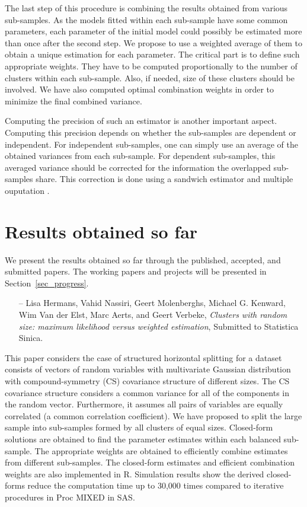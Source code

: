 \documentclass[14pt]{article}
\begin{document}
The last step of this procedure is combining the results obtained from various sub-samples. As the models fitted within each sub-sample have some common parameters, each parameter of the initial model could possibly be estimated more than once after the second step. We propose to use a weighted average of them to obtain a unique estimation for each parameter. The critical part is to define such appropriate weights. They have to be computed proportionally to the number of clusters within each sub-sample. Also, if needed, size of these clusters should be involved. We have also computed optimal combination weights in order to minimize the final combined variance.

Computing the precision of such an estimator is another important aspect. Computing this precision depends on whether the sub-samples are dependent or independent. For independent sub-samples, one can simply use an average of the obtained variances from each sub-sample. For dependent sub-samples, this averaged variance should be corrected for the information the overlapped sub-samples share. This correction is done using a sandwich estimator \citep{Verbeke2006, Verbeke2007} and multiple ouputation \citep{hoffman2001, follmann2003}.


\section{Results obtained so far}
\label{sec_results_so_far}
We present the results obtained so far through the published, accepted, and submitted papers. The working papers and projects will be presented in Section~\ref{sec_progress}.


\begin{itemize}
\item[--]{\textsf{Lisa Hermans, Vahid Nassiri, Geert Molenberghs, Michael G. Kenward, Wim Van der Elst, Marc Aerts, and Geert Verbeke}}, {\it Clusters with random size: maximum likelihood versus weighted estimation}, Submitted to Statistica Sinica.
\end{itemize}
This paper considers the case of structured horizontal splitting for a dataset consists of vectors of random variables with multivariate Gaussian distribution with compound-symmetry (CS) covariance structure of different sizes. The CS covariance structure considers a common variance for all of the components in the random vector. Furthermore, it assumes all pairs of variables are equally correlated (a common correlation coefficient). We have proposed to split the large sample into sub-samples formed by all clusters of equal sizes. Closed-form solutions are obtained to find the parameter estimates within each balanced sub-sample. The appropriate weights are obtained to efficiently combine estimates from different sub-samples. The closed-form estimates and efficient combination weights are also implemented in \textsf{R}. Simulation results show the derived closed-forms reduce the computation time up to 30,000 times compared to iterative procedures in \textsf{Proc MIXED} in \textsf{SAS}.
\end{document}
